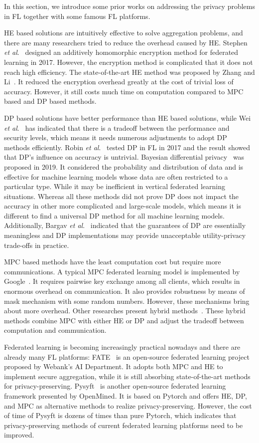 In this section, we introduce some prior works on addressing the privacy problems in FL together with some famous FL platforms.

HE based solutions are intuitively effective to solve aggregation problems, and there are many researchers tried to reduce the overhead caused by HE. Stephen \emph{et al}.~\cite{abs-1711-10677} designed an additively homomorphic encryption method for federated learning in 2017. However, the encryption method is complicated that it does not reach high efficiency. The state-of-the-art HE method was proposed by Zhang and Li~\cite{BatchCrypt}. It reduced the encryption overhead greatly at the cost of trivial loss of accuracy. However, it still costs much time on computation compared to MPC based and DP based methods.

DP based solutions have better performance than HE based solutions, while Wei \emph{et al}.~\cite{DPAnalysis} has indicated that there is a tradeoff between the performance and security levels, which means it needs numerous adjustments to adopt DP methods efficiently. Robin \emph{et al}.~\cite{geyer2017differentially} tested DP in FL in 2017 and the result showed that DP's influence on accuracy is untrivial. Bayesian differential privacy~\cite{Bayesian} was proposed in 2019. It considered the probability and distribution of data and is effective for machine learning models whose data are often restricted to a particular type. While it may be inefficient in vertical federated learning situations. Whereas all these methods did not prove DP does not impact the accuracy in other more complicated and large-scale models, which means it is different to find a universal DP method for all machine learning models. Additionally, Bargav \emph{et al}.~\cite{Bargav19} indicated that the guarantees of DP are essentially meaningless and DP implementations may provide unacceptable utility-privacy trade-offs in practice.

MPC based methods have the least computation cost but require more communications. A typical MPC federated learning model is implemented by Google~\cite{Practical}. It requires pairwise key exchange among all clients, which results in enormous overhead on communication. It also provides robustness by means of mask mechanism with some random numbers. However, these mechanisms bring about more overhead. Other researches present hybrid methods~\cite{Hybrid,HybridAlpha}. These hybrid methods combine MPC with either HE or DP and adjust the tradeoff between computation and communication.

Federated learning is becoming increasingly practical nowadays and there are already many FL platforms: FATE~\cite{fate} is an open-source federated learning project proposed by Webank’s AI Department. It adopts both MPC and HE to implement secure aggregation, while it is still absorbing state-of-the-art methods for privacy-preserving. Pysyft~\cite{pysyft} is another open-source federated learning framework presented by OpenMined. It is based on Pytorch and offers HE, DP, and MPC as alternative methods to realize privacy-preserving. However, the cost of time of Pysyft is dozens of times than pure Pytorch, which indicates that privacy-preserving methods of current federated learning platforms need to be improved.
